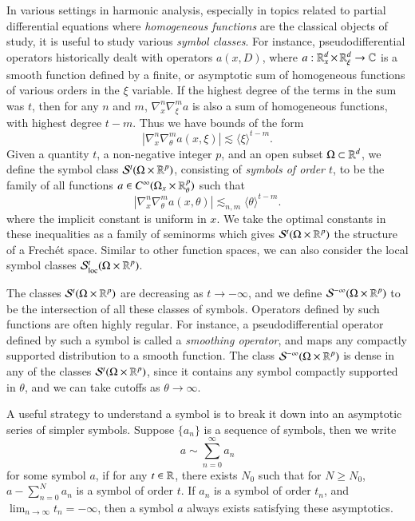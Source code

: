 In various settings in harmonic analysis, especially in topics related to partial differential equations where \emph{homogeneous functions} are the classical objects of study, it is useful to study various \emph{symbol classes}. For instance, pseudodifferential operators historically dealt with operators $a(x,D)$, where $a: \operatorname{\mathbb{R}}^d_x \times \operatorname{\mathbb{R}}^d_\xi \to \operatorname{\mathbb{C}}$ is a smooth function defined by a finite, or asymptotic sum of homogeneous functions of various orders in the $\xi$ variable. If the highest degree of the terms in the sum was $t$, then for any $n$ and $m$, $\nabla^n_x \nabla^m_\xi a$ is also a sum of homogeneous functions, with highest degree $t - m$. Thus we have bounds of the form
%
\[ | \nabla^n_x \nabla^m_\theta a(x,\xi) | \lesssim \langle \xi \rangle^{t - m}. \]
%
Given a quantity $t$, a non-negative integer $p$, and an open subset $\Omega \subset \operatorname{\mathbb{R}}^d$, we define the symbol class $\mathcal{S}^t(\Omega \times \operatorname{\mathbb{R}}^p)$, consisting of \emph{symbols of order $t$}, to be the family of all functions $a \in C^\infty(\Omega_x \times \operatorname{\mathbb{R}}^p_\theta)$ such that
%
\[ |\nabla^n_x \nabla^m_\theta a(x,\theta)| \lesssim_{n,m} \langle \theta \rangle^{t-m}. \]
%
where the implicit constant is uniform in $x$. We take the optimal constants in these inequalities as a family of seminorms which gives $\mathcal{S}^t(\Omega \times \operatorname{\mathbb{R}}^p)$ the structure of a Frech\'{e}t space. Similar to other function spaces, we can also consider the local symbol classes $\mathcal{S}^t_{\text{loc}}(\Omega \times \operatorname{\mathbb{R}}^p)$.

The classes $\mathcal{S}^t(\Omega \times \operatorname{\mathbb{R}}^p)$ are decreasing as $t \to -\infty$, and we define $\mathcal{S}^{-\infty}(\Omega \times \operatorname{\mathbb{R}}^p)$ to be the intersection of all these classes of symbols. Operators defined by such functions are often highly regular. For instance, a pseudodifferential operator defined by such a symbol is called a \emph{smoothing operator}, and maps any compactly supported distribution to a smooth function. The class $\mathcal{S}^{-\infty}(\Omega \times \operatorname{\mathbb{R}}^p)$ is dense in any of the classes $\mathcal{S}^t(\Omega \times \operatorname{\mathbb{R}}^p)$, since it contains any symbol compactly supported in $\theta$, and we can take cutoffs as $\theta \to \infty$.

A useful strategy to understand a symbol is to break it down into an asymptotic series of simpler symbols. Suppose $\{ a_n \}$ is a sequence of symbols, then we write
%
\[ a \sim \sum_{n = 0}^\infty a_n \]
%
for some symbol $a$, if for any $t \in \operatorname{\mathbb{R}}$, there exists $N_0$ such that for $N \geq N_0$, $a - \sum_{n = 0}^N a_n$ is a symbol of order $t$. If $a_n$ is a symbol of order $t_n$, and $\lim_{n \to \infty} t_n = -\infty$, then a symbol $a$ always exists satisfying these asymptotics.


